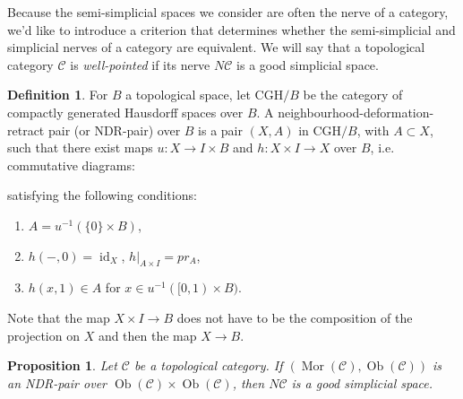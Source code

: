 \documentclass[12pt]{amsart}
\theoremstyle{plain}
\newtheorem{prop}[teo]{Proposition}
\theoremstyle{definition}
\newtheorem{defi}[teo]{Definition}
\theoremstyle{remark}
\DeclareMathOperator{\id}{id}
\DeclareMathOperator{\Mor}{Mor}
\DeclareMathOperator{\Ob}{Ob}
\newcommand{\C}{\mathcal{C}}
\begin{document}
Because the semi-simplicial spaces we consider are often the nerve of a category, we'd like to introduce a criterion that determines whether the semi-simplicial and simplicial nerves of a category are equivalent.
We will say that a topological category $\C$ is \emph{well-pointed} if its nerve $N\C$ is a good simplicial space. 

\begin{defi}\label{NDRgood}
For $B$ a topological space, let $\mathrm{CGH}/B$ be the category of compactly generated Hausdorff spaces over $B$. 
A neighbourhood-deformation-retract pair (or NDR-pair) over $B$ is a pair $(X,A)$ in $\mathrm{CGH}/B$, with $A\subset X$, such that there exist maps $u:X\rightarrow I\times B$ and $h: X\times I\rightarrow X$ over $B$, i.e. commutative diagrams:
\begin{center}
\begin{minipage}{0.4\linewidth}
\begin{center}
\end{center}
\end{minipage}
\begin{minipage}{0.4\linewidth}
\begin{center}
\end{center}
\end{minipage}
\end{center}
satisfying the following conditions:
\begin{enumerate}
    \item $A = u^{-1}(\{0\}\times B)$,
    \item $h(-,0) = \id_X$,  $h\vert_{A\times I} = pr_A$,
    \item $h(x,1)\in A$ for $x\in u^{-1}([0,1)\times B)$.
\end{enumerate}
Note that the map $X\times I\rightarrow B$ does not have to be the composition of the projection on $X$ and then the map $X\rightarrow B$.
\end{defi}

\begin{prop}\cite[Proposition~10]{TopQuillenA}
Let $\C$ be a topological category. If $(\Mor(\C), \Ob(\C))$ is an NDR-pair over $\Ob(\C)\times \Ob(\C)$, then $N\C$ is a good simplicial space.
\end{prop}
\end{document}
